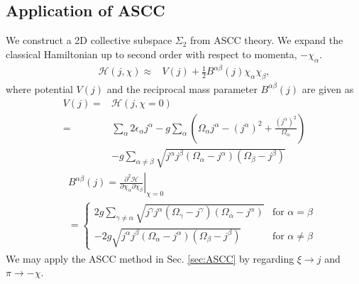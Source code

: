 \documentclass[%
superscriptaddress,
showpacs,
nofootinbib,
amsmath,amssymb,
aps,
prc,
twocolumn,
floatfix ]%
{revtex4-1}
\begin{document}
\subsection{Application of ASCC}

We construct a 2D collective subspace $\Sigma_2$ from ASCC theory.
We expand the classical Hamiltonian up to second order with respect to
momenta, $-\chi_{\alpha}$. 
\begin{align}
  \mathcal{H}(j,\chi) \approx& V(j) + \frac{1}{2}B^{\alpha\beta}(j)\chi_{\alpha}\chi_{\beta},
\end{align}
where potential $V(j)$ and the reciprocal mass parameter
$B^{\alpha\beta}(j)$ are given as
\begin{align}
  V(j) =& \mathcal{H}(j,\chi=0) \nonumber \\
	=& \sum_{\alpha} 2\epsilon_{\alpha}j^{\alpha} - g\sum_{\alpha} \left( \Omega_{\alpha}j^{\alpha} - (j^{\alpha})^2 +\frac{(j^{\alpha})^2}{\Omega_{\alpha}} \right) \nonumber \\
  &- g\sum_{\alpha\ne \beta} \sqrt{j^{\alpha}j^{\beta}(\Omega_{\alpha}-j^{\alpha})(\Omega_{\beta}-j^{\beta})} 	
\end{align}
\begin{eqnarray}
&&B^{\alpha\beta}(j) = \left. \frac{\partial^2\mathcal{H}}{\partial\chi_{\alpha}\partial\chi_{\beta}} \right|_{\chi=0} \\
\label{mass}
&&=
	\begin{cases}
2g\sum_{\gamma\ne \alpha} \sqrt{j^{\gamma}j^{\alpha}(\Omega_{\gamma}-j^{\gamma})(\Omega_{\alpha}-j^{\alpha})}
		& \text{for $\alpha=\beta$} \\
-2g\sqrt{j^{\alpha}j^{\beta}(\Omega_{\alpha}-j^{\alpha})(\Omega_{\beta}-j^{\beta})}
		& \text{for $\alpha\ne\beta$}
	\end{cases} \nonumber
\end{eqnarray}
We may apply the ASCC method in Sec. \ref{sec:ASCC}
by regarding $\xi\to j$ and $\pi\to-\chi$.
\end{document}
